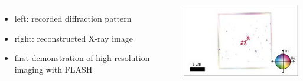 \documentclass[10pt,t]{beamer}
\begin{document}
\begin{frame}
\begin{columns}[c]
\begin{itemize}
    \item left: recorded diffraction pattern
    \item right: reconstructed X-ray image
    \item first demonstration of high-resolution imaging with FLASH
\end{itemize}
\includegraphics[width=\textwidth]{flash-rekonstruiert}
\end{columns}
\vspace*{-3pt}
\end{frame}
\end{document}
